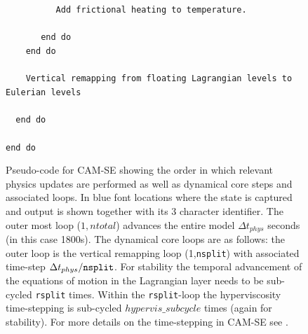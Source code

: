 \documentclass{agujournal}
\begin{document}
\begin{figure}[h]
\verb+          Add frictional heating to temperature.+\\
\verb+          +{\color{blue}{output 'dAH'}}\\
\verb+       end do+\\
\verb+    end do+\\
\verb+    +{\color{blue}{output 'dAD'}}\\
\verb+    Vertical remapping from floating Lagrangian levels to Eulerian levels+\\
\verb+    +{\color{blue}{output 'dAR'}}\\
\verb+  end do+\\
\verb+  +{\color{blue}{output 'dBF'}}\\
\verb+end do+
\caption{Pseudo-code for CAM-SE showing the order in which relevant physics updates are performed as well as dynamical core steps and associated loops. In blue font locations where the state is captured and output is shown together with its 3 character identifier. The outer most loop ($1,ntotal$)  advances the entire model $\Delta t_{phys}$ seconds (in this case 1800s). The dynamical core loops are as follows: the outer loop is the vertical remapping loop (1,{\tt{nsplit}}) with associated time-step $\Delta t_{phys}/{\tt{nsplit}}$. For stability the temporal advancement of the equations of motion in the Lagrangian layer needs to be sub-cycled {\tt{rsplit}} times. Within the {\tt{rsplit}}-loop the hyperviscosity time-stepping is sub-cycled $hypervis\_subcycle$ times (again for stability). For more details on the time-stepping in CAM-SE see \citet{LetAl2018JAMES}.}
\label{fig:dAD}
\end{figure}
\end{document}
